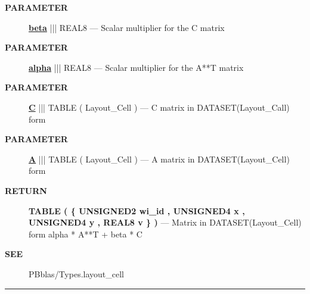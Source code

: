 \par
\begin{description}
\item [\colorbox{tagtype}{\color{white} \textbf{\textsf{PARAMETER}}}] \textbf{\underline{beta}} ||| REAL8 --- Scalar multiplier for the C matrix
\item [\colorbox{tagtype}{\color{white} \textbf{\textsf{PARAMETER}}}] \textbf{\underline{alpha}} ||| REAL8 --- Scalar multiplier for the A**T matrix
\item [\colorbox{tagtype}{\color{white} \textbf{\textsf{PARAMETER}}}] \textbf{\underline{C}} ||| TABLE ( Layout\_Cell ) --- C matrix in DATASET(Layout\_Call) form
\item [\colorbox{tagtype}{\color{white} \textbf{\textsf{PARAMETER}}}] \textbf{\underline{A}} ||| TABLE ( Layout\_Cell ) --- A matrix in DATASET(Layout\_Cell) form
\end{description}







\par
\begin{description}
\item [\colorbox{tagtype}{\color{white} \textbf{\textsf{RETURN}}}] \textbf{TABLE ( \{ UNSIGNED2 wi\_id , UNSIGNED4 x , UNSIGNED4 y , REAL8 v \} )} --- Matrix in DATASET(Layout\_Cell) form alpha * A**T + beta * C
\end{description}






\par
\begin{description}
\item [\colorbox{tagtype}{\color{white} \textbf{\textsf{SEE}}}] PBblas/Types.layout\_cell
\end{description}




\rule{\linewidth}{0.5pt}
